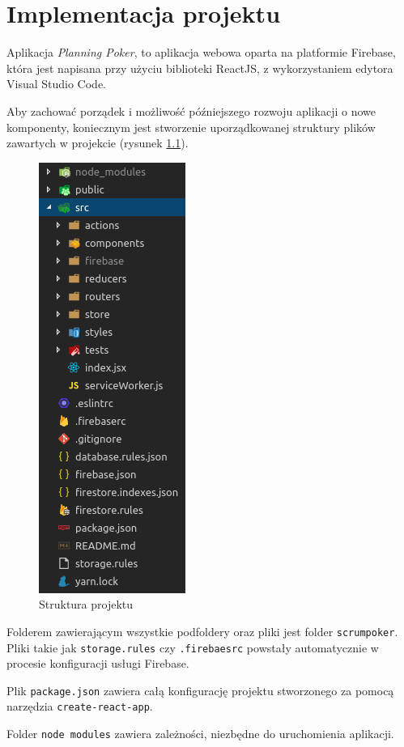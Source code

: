 \chapter{Implementacja projektu}

Aplikacja \textit{Planning Poker}, to aplikacja webowa oparta na platformie Firebase,
która jest napisana przy użyciu biblioteki ReactJS, z wykorzystaniem
edytora Visual Studio Code.

Aby zachować porządek i możliwość późniejszego rozwoju aplikacji o nowe komponenty,
koniecznym jest stworzenie uporządkowanej struktury plików zawartych w projekcie
(rysunek \ref{rys:projekt}).

\begin{figure}[H]
	\centering\includegraphics[width=.3\textwidth]{img/projekt}
	\caption{Struktura projektu}\label{rys:projekt}%
\end{figure}

Folderem zawierającym wszystkie podfoldery oraz pliki jest folder \texttt{scrumpoker}.
Pliki takie jak \texttt{storage.rules} czy \texttt{.firebaesrc} powstały automatycznie
w procesie konfiguracji usługi Firebase.

Plik \texttt{package.json} zawiera całą konfigurację projektu stworzonego
za pomocą narzędzia \texttt{create-react-app}.

Folder \texttt{node modules} zawiera zależności, niezbędne do uruchomienia aplikacji.

